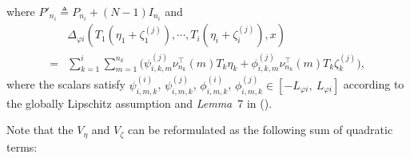 \documentclass{ifacconf}
\begin{document}
where $P'_{n_i}\triangleq P_{n_i}+(N-1)I_{n_i}$ and 
\begin{equation}
    \begin{aligned}
        &\Delta_{\varphi i}(T_1(\eta_1+\zeta_1^{(j)}),\cdots,T_i(\eta_i+\zeta_i^{(j)}),x)\\
        =&\sum^i_{k=1}\sum^{n_k}_{m=1}\bigg(\psi^{(j)}_{i,k,m}\nu_{n_k}^\top(m)T_k\eta_k+\phi^{(j)}_{i,k,m}\nu_{n_k}^\top(m)T_k\zeta_k^{(j)}\bigg),
    \end{aligned}\nonumber
\end{equation}
where the scalars satisfy $\psi^{(i)}_{i,m,k}$, $\psi^{(j)}_{i,m,k}$, $\phi^{(i)}_{i,m,k}$, $\phi^{(j)}_{i,m,k}\in[-L_{\varphi i},\ L_{\varphi i}]$ according to the globally Lipschitz assumption and \textit{Lemma}~7 in (\cite{zemouche2013lmi}).

Note that the $V_\eta$ and $V_\zeta$ can be reformulated as the following sum of quadratic terms:
    
\end{document}
